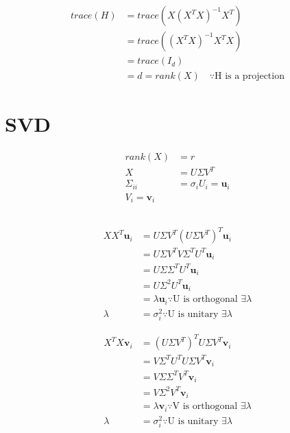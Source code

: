 \documentclass[12pt,a4paper]{article}
\begin{document}
\subsection{}
\begin{align*}
trace(H) &= trace(X(X^T X)^{-1}X^T)\\
&= trace((X^T X)^{-1}X^TX)\\
&= trace(I_d) \\
&= d = rank(X)\quad \because \text{H is a projection}
\end{align*}

\section{SVD}

\begin{align}
rank(X) &= r\\
X &= U\Sigma V^T\\
\Sigma_{ii} &= \sigma_i
U_i = \textbf{u}_i\\
V_i = \textbf{v}_i
\end{align}

\subsection{}

\begin{align*}
XX^T\textbf{u}_i &= U\Sigma V^T(U\Sigma V^T)^T\textbf{u}_i\\
&= U\Sigma V^TV\Sigma^T U^T\textbf{u}_i\\
&= U\Sigma\Sigma^T U^T\textbf{u}_i\\
&= U\Sigma^2 U^T\textbf{u}_i\\
&= \lambda \textbf{u}_i  \because \text{U is orthogonal } \exists \lambda\\
\lambda &= \sigma_i^2 \because \text{U is unitary } \exists \lambda
\end{align*}

\begin{align*}
X^TX\textbf{v}_i &= (U\Sigma V^T)^TU\Sigma V^T\textbf{v}_i\\
&= V\Sigma^T U^TU\Sigma V^T\textbf{v}_i\\
&= V\Sigma\Sigma^T V^T\textbf{v}_i\\
&= V\Sigma^2 V^T\textbf{v}_i\\
&= \lambda \textbf{v}_i  \because \text{V is orthogonal } \exists \lambda\\
\lambda &= \sigma_i^2 \because \text{U is unitary } \exists \lambda
\end{align*}
\end{document}
